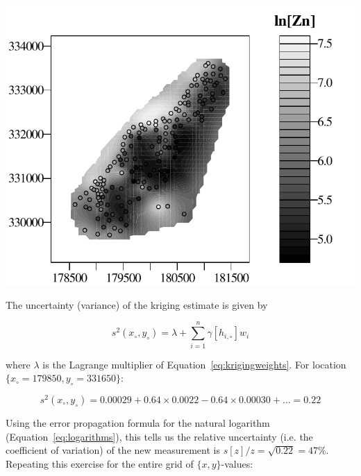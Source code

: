 \noindent\begin{minipage}[t][][b]{.6\textwidth}
\includegraphics[width=\textwidth]{../figures/meusecontour.pdf}
\end{minipage}
\begin{minipage}[t][][t]{.39\textwidth}
  \label{fig:meusecontour}
\end{minipage}

The uncertainty (variance) of the kriging estimate is given by

\begin{equation}
  s^2(x_\circ,y_\circ) = \lambda + \sum\limits_{i=1}^n \gamma[h_{i,\circ}] w_i
  \label{eq:kriginvar}
\end{equation}

\noindent where $\lambda$ is the Lagrange multiplier of
Equation~\ref{eq:krigingweights}. For location
$\{x_\circ=179850,y_\circ=331650\}$:

\[
s^2(x_\circ,y_\circ) = 0.00029 + 0.64 \times 0.0022 - 0.64 \times
0.00030 + \ldots = 0.22
\]

Using the error propagation formula for the natural logarithm
(Equation~\ref{eq:logarithms}), this tells us the relative uncertainty
(i.e. the coefficient of variation) of the new measurement is
$s[z]/z=\sqrt{0.22}=47$\%. Repeating this exercise for the entire grid
of $\{x,y\}$-values:

